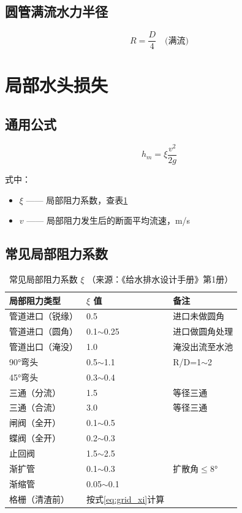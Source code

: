 \documentclass[12pt,a4paper]{ctexart}
\begin{document}
\subsection{圆管满流水力半径}

\begin{equation}
    R = \frac{D}{4} \quad \text{(满流)}
    \label{eq:r_full}
\end{equation}

\section{局部水头损失}

\subsection{通用公式}

\begin{equation}
    h_m = \xi \frac{v^2}{2g}
    \label{eq:hm}
\end{equation}

式中：
\begin{itemize}[nosep]
    \item $\xi$ —— 局部阻力系数，查表\ref{tab:local_xi}
    \item $v$ —— 局部阻力发生后的断面平均流速，m/s
\end{itemize}

\subsection{常见局部阻力系数}

\begin{table}[htbp]
\centering
\caption{常见局部阻力系数 $\xi$ （来源：《给水排水设计手册》第1册）}
\label{tab:local_xi}
\begin{tabular}{@{}lll@{}}
\toprule
\textbf{局部阻力类型} & \textbf{$\xi$ 值} & \textbf{备注} \\
\midrule
管道进口（锐缘）    & 0.5        & 进口未做圆角 \\
管道进口（圆角）    & 0.1$\sim$0.25 & 进口做圆角处理 \\
管道出口（淹没）    & 1.0        & 淹没出流至水池 \\
90°弯头            & 0.5$\sim$1.1 & R/D=1$\sim$2 \\
45°弯头            & 0.3$\sim$0.4 & \\
三通（分流）        & 1.5        & 等径三通 \\
三通（合流）        & 3.0        & 等径三通 \\
闸阀（全开）        & 0.1$\sim$0.5 & \\
蝶阀（全开）        & 0.2$\sim$0.3 & \\
止回阀              & 1.5$\sim$2.5 & \\
渐扩管              & 0.1$\sim$0.3 & 扩散角$\leq$8° \\
渐缩管              & 0.05$\sim$0.1 & \\
格栅（清渣前）      & 按式\ref{eq:grid_xi}计算 & \\
\bottomrule
\end{tabular}
\end{table}
\end{document}
